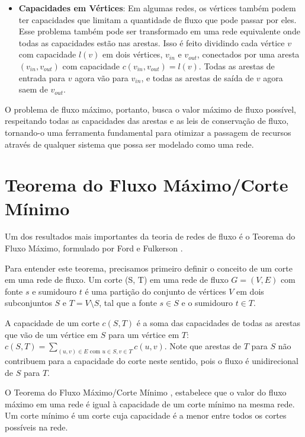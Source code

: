 \documentclass[12pt]{article}
\begin{document}
\begin{itemize}
\begin{itemize}
    \end{itemize}
    \item \textbf{Capacidades em Vértices}: Em algumas redes, os vértices também podem ter capacidades que limitam a quantidade de fluxo que pode passar por eles. Esse problema também pode ser transformado em uma rede equivalente onde todas as capacidades estão nas arestas. Isso é feito dividindo cada vértice $v$ com capacidade $l(v)$ em dois vértices, $v_{in}$ e $v_{out}$, conectados por uma aresta $(v_{in}, v_{out})$ com capacidade $c(v_{in}, v_{out}) = l(v)$. Todas as arestas de entrada para $v$ agora vão para $v_{in}$, e todas as arestas de saída de $v$ agora saem de $v_{out}$.
\end{itemize}
 
\noindent O problema de fluxo máximo, portanto, busca o valor máximo de fluxo possível, respeitando todas as capacidades das arestas e as leis de conservação de fluxo, tornando-o uma ferramenta fundamental para otimizar a passagem de recursos através de qualquer sistema que possa ser modelado como uma rede.

\section{Teorema do Fluxo Máximo/Corte Mínimo}

Um dos resultados mais importantes da teoria de redes de fluxo é o Teorema do Fluxo Máximo, formulado por Ford e Fulkerson \cite{ford1956maximal}.

\noindent Para entender este teorema, precisamos primeiro definir o conceito de um corte em uma rede de fluxo. Um corte (S, T) em uma rede de fluxo $G=(V, E)$ com fonte $s$ e sumidouro $t$ é uma partição do conjunto de vértices $V$ em dois subconjuntos $S$ e $T = V \setminus S$, tal que a fonte $s \in S$ e o sumidouro $t \in T$.

A capacidade de um corte $c(S, T)$ é a soma das capacidades de todas as arestas que vão de um vértice em $S$ para um vértice em $T$: $c(S, T) = \sum_{(u,v) \in E \text{ com } u \in S, v \in T} c(u, v)$. Note que arestas de $T$ para $S$ não contribuem para a capacidade do corte neste sentido, pois o fluxo é unidirecional de $S$ para $T$.

\noindent O Teorema do Fluxo Máximo/Corte Mínimo \cite{cormen2009}, estabelece que o valor do fluxo máximo em uma rede é igual à capacidade de um corte mínimo na mesma rede. Um corte mínimo é um corte cuja capacidade é a menor entre todos os cortes possíveis na rede.
\end{document}
